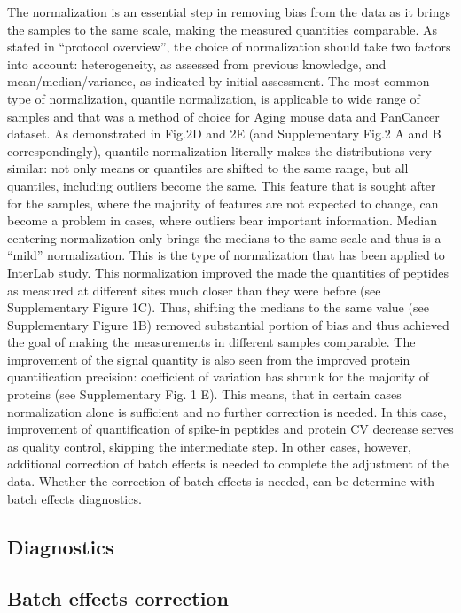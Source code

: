 \documentclass[num-refs]{wiley-article}
\begin{document}
The normalization is an essential step in removing bias from the data as it brings the samples to the same scale, making the measured quantities comparable. As stated in “protocol overview”, the choice of normalization should take two factors into account: 
heterogeneity, as assessed from previous knowledge, and mean/median/variance, as indicated by initial assessment.
The most common type of normalization, quantile normalization, is applicable to wide range of samples and that was a method of choice for Aging mouse data and PanCancer dataset. As demonstrated in Fig.2D and 2E (and Supplementary Fig.2 A and B correspondingly), quantile normalization literally makes the distributions very similar: not only means or quantiles are shifted to the same range, but all quantiles, including outliers become the same. This feature that is sought after for the samples, where the majority of features are not expected to change, can become a problem in cases, where outliers bear important information.
Median centering normalization only brings the medians to the same scale and thus is a “mild” normalization. This is the type of normalization that has been applied to InterLab study. This normalization improved the made the quantities of peptides as measured at different sites much closer than they were before (see Supplementary Figure 1C). Thus, shifting the medians to the same value (see Supplementary Figure 1B) removed substantial portion of bias and thus achieved the goal of making the measurements in different samples comparable. The improvement of the signal quantity is also seen from the improved protein quantification precision: coefficient of variation has shrunk for the majority of proteins (see Supplementary Fig. 1 E).
This means, that in certain cases normalization alone is sufficient and no further correction is needed. In this case, improvement of quantification of spike-in peptides and protein CV decrease serves as quality control, skipping the intermediate step.
In other cases, however, additional correction of batch effects is needed to complete the adjustment of the data. Whether the correction of batch effects is needed, can be determine with batch effects diagnostics.


\subsection{Diagnostics}

\subsection{Batch effects correction}
\end{document}

